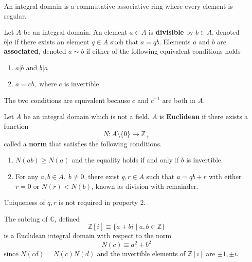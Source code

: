     \begin{proposition}
      An integral domain is a commutative associative ring where every element is regular. 
    \end{proposition}

    \begin{definition}
      Let $A$ be an integral domain. An element $a \in A$ is \textbf{divisible} by $b \in A$, denoted $b | a$ if there exists an element $q \in A$ such that $a = q b$. Elements $a$ and $b$ are \textbf{associated}, denoted $a \sim b$ if either of the following equivalent conditions holds
      \begin{enumerate}
          \item $a | b \text{ and } b | a$
          \item $a = c b, \text{ where } c$ is invertible
      \end{enumerate}
      The two conditions are equivalent because $c$ and $c^{-1}$ are both in $A$. 
    \end{definition}

    \begin{definition}
      Let $A$ be an integral domain which is not a field. $A$ is \textbf{Euclidean} if there exists a function 
      \begin{equation}
        N: A \setminus \{ 0 \} \longrightarrow \mathbb{Z}_+
      \end{equation}
      called a \textbf{norm} that satisfies the following conditions. 
      \begin{enumerate}
        \item $N(a b) \geq N(a)$ and the equality holds if and only if $b$ is invertible. 
        \item For any $a, b \in A, \; b \neq 0$, there exist $q, r \in A$ such that $a = q b + r$ with either $r = 0$ or $ N(r) < N(b)$, known as division with remainder. 
      \end{enumerate}
      Uniqueness of $q, r$ is not required in property 2. 
    \end{definition}

    \begin{example}
      The subring of $\mathbb{C}$, defined
      \begin{equation}
        \mathbb{Z}[i] \equiv \{ a + b i \; | \; a, b \in \mathbb{Z} \}
      \end{equation}
      is a Euclidean integral domain with respect to the norm 
      \begin{equation}
        N(c) \equiv a^2 + b^2
      \end{equation}
      since $N(c d) = N(c) N(d)$ and the invertible elements of $\mathbb{Z}[i]$ are $\pm 1, \pm i$. 
    \end{example}

